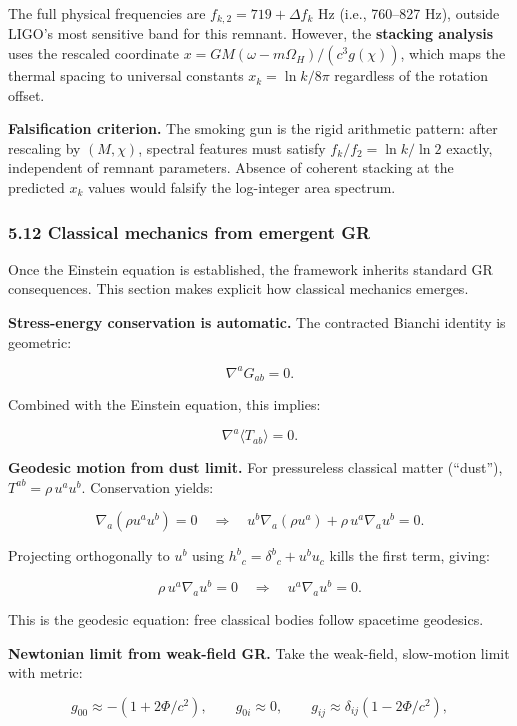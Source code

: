 \documentclass[
]{article}
\begin{document}
The full physical frequencies are \(f_{k,2} = 719 + \Delta f_k\) Hz
(i.e., 760--827 Hz), outside LIGO's most sensitive band for this
remnant. However, the \textbf{stacking analysis} uses the rescaled
coordinate \(x = GM(\omega -
m\Omega_H)/(c^3 g(\chi))\), which maps the thermal spacing to universal
constants \(x_k = \ln k / 8\pi\) regardless of the rotation offset.

\textbf{Falsification criterion.} The smoking gun is the rigid
arithmetic pattern: after rescaling by \((M, \chi)\), spectral features
must satisfy \(f_k/f_2 =
\ln k / \ln 2\) exactly, independent of remnant parameters. Absence of
coherent stacking at the predicted \(x_k\) values would falsify the
log-integer area spectrum.

\subsubsection{5.12 Classical mechanics from emergent
GR}\label{classical-mechanics-from-emergent-gr}

Once the Einstein equation is established, the framework inherits
standard GR consequences. This section makes explicit how classical
mechanics emerges.

\textbf{Stress-energy conservation is automatic.} The contracted Bianchi
identity is geometric:

\[
\nabla^a G_{ab} = 0.
\]

Combined with the Einstein equation, this implies:

\[
\nabla^a \langle T_{ab} \rangle = 0.
\]

\textbf{Geodesic motion from dust limit.} For pressureless classical
matter (``dust''), \(T^{ab} = \rho \, u^a u^b\). Conservation yields:

\[
\nabla_a(\rho u^a u^b) = 0
\quad \Rightarrow \quad
u^b \nabla_a(\rho u^a) + \rho \, u^a \nabla_a u^b = 0.
\]

Projecting orthogonally to \(u^b\) using
\(h^b{}_c = \delta^b{}_c + u^b u_c\) kills the first term, giving:

\[
\rho \, u^a \nabla_a u^b = 0
\quad \Rightarrow \quad
u^a \nabla_a u^b = 0.
\]

This is the geodesic equation: free classical bodies follow spacetime
geodesics.

\textbf{Newtonian limit from weak-field GR.} Take the weak-field,
slow-motion limit with metric:

\[
g_{00} \approx -(1 + 2\Phi/c^2), \qquad
g_{0i} \approx 0, \qquad
g_{ij} \approx \delta_{ij}(1 - 2\Phi/c^2),
\]
\end{document}
